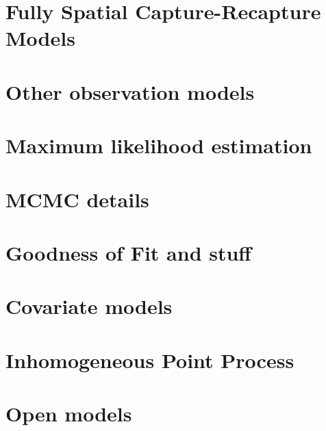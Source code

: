 \documentclass[dvips]{book}
\theoremstyle{plain}
\theoremstyle{definition}
\theoremstyle{remark}
\begin{document}
\chapter{Fully Spatial Capture-Recapture Models}
\label{chapt.scr0}

%

\chapter{Other observation models}
\label{chapt.poisson}

\chapter{Maximum likelihood estimation}
\label{chapt.mle}

\chapter{MCMC details}
\label{chapt.mcmc}

\chapter{Goodness of Fit and stuff}
\label{chapt.gof}

\chapter{Covariate models}
\label{chapt.covariates}

\chapter{Inhomogeneous Point Process}
\label{chapt.ipp}

\chapter{Open models}
\label{chapt.open}



%
%



%
%
%
\end{document}

